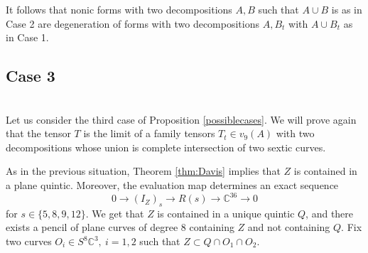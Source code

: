 \documentclass{amsart}
\newcommand{\C}{\mathbb{C}}
\theoremstyle{definition}
\begin{document}
It follows that nonic forms with two decompositions $A,B$ such that $A\cup B$ is as in Case 2 are degeneration of
forms with two decompositions $A,B_t$ with $A\cup B_t$ as in Case 1. 


\subsection{Case 3} \quad\\
\noindent Let us consider the third case of Proposition \ref{possiblecases}.
We will prove again that the tensor $T$ is the limit of a family tensors $T_t\in v_9(A)$
with two decompositions whose union is complete intersection of two sextic curves.

As in the previous situation, Theorem \ref{thm:Davis} implies that $ Z $ is contained in a plane quintic. Moreover, the evaluation map determines an exact sequence
$$ 0 \rightarrow (I_{Z})_s \rightarrow R(s) \rightarrow \C^{36} \rightarrow 0  $$
for $ s \in \{5, 8, 9,12\} $. We get that $ Z $ is contained in a unique quintic $Q$, and there exists a pencil of plane curves of degree $8$ containing $Z$ 
and not containing $Q$. Fix  two curves $ O_{i} \in S^{8} \C^{3},\ i=1,2 $ such that $Z\subset Q\cap O_1\cap O_2$.
\end{document}
